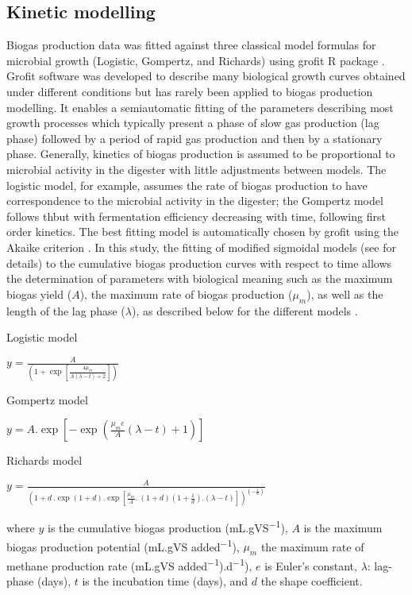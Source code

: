 \subsection{Kinetic modelling}
Biogas production data was fitted against three classical model formulas for microbial growth (Logistic, Gompertz, and Richards) using grofit R package \cite{Kahm_2010}. Grofit software was developed to describe many biological growth curves obtained under different conditions but has rarely been applied to biogas production modelling. It enables a semiautomatic fitting of the parameters describing most growth processes which typically present a phase of slow gas production (lag phase) followed by a period of rapid gas production and then by a stationary phase. Generally, kinetics of biogas production is assumed to be proportional to microbial activity in the digester with little adjustments between models. The logistic model, for example, assumes the rate of biogas production to have correspondence to the microbial activity in the digester; the Gompertz model follows thbut with fermentation efficiency decreasing with time, following first order kinetics. The best fitting model is automatically chosen by grofit using the Akaike criterion \cite{Hasenbrink_2006}. In this study, the fitting of modified sigmoidal models (see \cite{Zwietering1990} for details) to the cumulative biogas production curves with respect to time allows the determination of parameters with biological meaning such as the maximum biogas yield ($A$), the maximum rate of biogas production ($μ_m$), as well as the length of the lag phase ($λ$), as described below for the different models \cite{Zwietering1990,Ware_2017,Alta__2009}.

Logistic model

\(y=\frac{A}{\left(1+\exp\left[\frac{4\mu_m}{A\left(\lambda-t\right)+2}\right]\right)}\)

Gompertz model

\(y=A.\exp\left[-\exp\left(\frac{\mu_me}{A}\left(\lambda-t\right)+1\right)\right]\)

Richards model

\(y=\frac{A}{\left(1+d\ .\exp\left(1+d\right).\exp\left[\frac{\mu_m}{A}.\ \left(1+d\right)\left(1+\frac{1}{d}\right).\left(\lambda-t\right)\right]\right)^{\left(-\frac{1}{d}\right)}}\)


where $y$ is the cumulative biogas production (mL.gVS\textsuperscript{−1}), $A$ is the maximum biogas production potential (mL.gVS added\textsuperscript{−1}), $μ_m$ the maximum rate of methane production rate (mL.gVS added\textsuperscript{−1}).d\textsuperscript{−1}), $e$ is Euler's constant, $λ$: lag-phase (days), $t$ is the incubation time (days), and $d$ the shape coefficient.